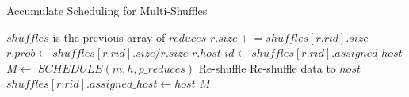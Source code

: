 \begin{minipage}{\columnwidth}
\begin{algorithm}[H]
\caption{Accumulate Scheduling for Multi-Shuffles}
\label{mhminheap}
	\begin{algorithmic}[1]
	\small
		\State
		\Comment $shuffles$ is the previous array of $reduces$ 
			\State $r.size \mathrel{+}= shuffles\left[r.rid\right].size$
				\State $r.prob\gets shuffles\left[r.rid\right].size / r.size$
				\State $r.host\_id\gets shuffles\left[r.rid\right].assigned\_host$
			\EndIf
		\EndFor
		\State $M\gets$ $SCHEDULE\left(m, h, p\_reduces\right)$
			\Comment Re-shuffle
				\State Re-shuffle data to $host$
				\State $shuffles\left[r.rid\right].assigned\_host\gets host$
				\EndIf
			\EndFor
		\EndFor
		\Return $M$
	\EndProcedure
	\end{algorithmic}
\end{algorithm}
\end{minipage} 